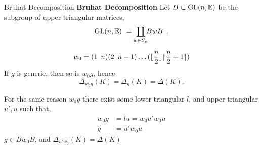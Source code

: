 \documentclass[9pt]{beamer}
\theoremstyle{definition}
\begin{document}
  \begin{frame}[fragile]{Bruhat Decomposition}
    \textbf{Bruhat Decomposition}
    Let $B \subset \mathrm{GL}(n, {\mathbb E})$ be the subgroup of upper triangular matrices, 
    \begin{equation*}
      \GL(n, \EE) \ = \ \smashoperator{\coprod_{w \in S_n}} BwB \enspace .
    \end{equation*}
    \pause

  \[
    w_0 = (1 \enspace n)(2 \enspace n - 1)\ldots(\lfloor\frac{n}{2}\rfloor \lceil\frac{n}{2} + 1\rceil)
  \]
  If $g$ is generic, then so is $w_0g$, hence
  \[
    \Delta_{w_0g}(K) = \Delta_{g}(K) = \Delta(K).
  \]

  For the same reason $w_0g$ there exist some lower triangular $l$, and upper triangular $u', u$ such that,
    \begin{align*}
      w_0g &= lu = w_0u'w_0u\\
      g &= u'w_0u
    \end{align*}
    $g \in Bw_0B$, and $\Delta_{u'w_0}(K) = \Delta(K)$
\end{frame}
\end{document}
